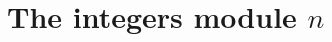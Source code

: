 \documentclass[11pt,a4paper]{article}
\begin{document}
\def\contador{2}



\section{The integers module $n$}
\end{document}
